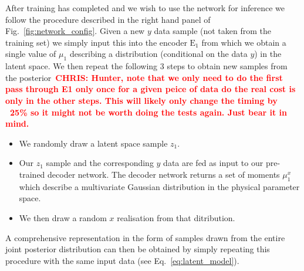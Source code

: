 \documentclass[%
showpacs,
 amsmath,amssymb,
 aps,
 twocolumn,
 prl,
 reprint,
floatfix,
]{revtex4-1}
\newcommand{\chris}[1]{\textbf{\textcolor{red}{CHRIS: #1}}}
\begin{document}
%
%
After training has completed and we wish to use the network for inference we
follow the procedure described in the right hand panel of
Fig.~\ref{fig:network_config}. Given a new $y$ data sample (not taken from the
training set) we simply input this into the encoder $\textrm{E}_1$ from which
we obtain a single value of $\mu_{1}$ describing a distribution (conditional on
the data $y$) in the latent space. We then repeat the following 3 steps to
obtain new samples from the posterior~\chris{Hunter, note that we only need to
do the first pass through E1 only once for a given peice of data do the real
cost is only in the other steps. This will likely only change the timing by
~25\% so it might not be worth doing the tests again. Just bear it in mind.}
%
\begin{itemize}
%
\item We randomly draw a latent space sample $z_1$. 
%
\item Our $z_1$ sample and the corresponding $y$ data are fed as input to our
pre-trained decoder network. The decoder network returns a set of moments
$\mu^{x}_1$ which describe a multivariate Gaussian distribution in the physical
parameter space.
%
\item We then draw a random $x$ realisation from that ditribution. 
%
\end{itemize}
%
A comprehensive representation in the form of samples drawn from the entire
joint posterior distribution can then be obtained by simply repeating this
procedure with the same input data (see Eq.~\ref{eq:latent_model}).
\end{document}
